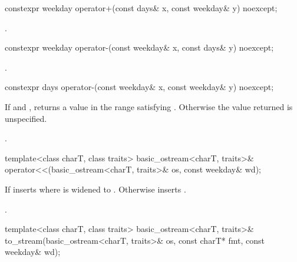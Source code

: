 %
\begin{itemdecl}
constexpr weekday operator+(const days& x, const weekday& y) noexcept;
\end{itemdecl}

\begin{itemdescr}
\pnum
\returns {}.
\end{itemdescr}

%
\begin{itemdecl}
constexpr weekday operator-(const weekday& x, const days& y) noexcept;
\end{itemdecl}

\begin{itemdescr}
\pnum
\returns {}.
\end{itemdescr}

%
\begin{itemdecl}
constexpr days operator-(const weekday& x, const weekday& y) noexcept;
\end{itemdecl}

\begin{itemdescr}
\pnum
\returns
If 
and ,
returns a value 
in the range 
satisfying .
Otherwise the value returned is unspecified.
\begin{example}
.
\end{example}
\end{itemdescr}

%
\begin{itemdecl}
template<class charT, class traits>
  basic_ostream<charT, traits>&
    operator<<(basic_ostream<charT, traits>& os, const weekday& wd);
\end{itemdecl}

\begin{itemdescr}
\pnum
\effects
If 
inserts 
where  is  widened to .
Otherwise inserts .

\pnum
\returns {}.
\end{itemdescr}

%
\begin{itemdecl}
template<class charT, class traits>
  basic_ostream<charT, traits>&
    to_stream(basic_ostream<charT, traits>& os, const charT* fmt, const weekday& wd);
\end{itemdecl}

